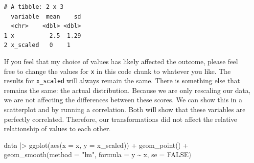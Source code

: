 \documentclass[
  letterpaper,
  DIV=11,
  numbers=noendperiod]{scrreprt}
\newenvironment{Shaded}{\begin{snugshade}}{\end{snugshade}}
\newcommand{\AttributeTok}[1]{\textcolor[rgb]{0.40,0.45,0.13}{#1}}
\newcommand{\CommentTok}[1]{\textcolor[rgb]{0.37,0.37,0.37}{#1}}
\newcommand{\ConstantTok}[1]{\textcolor[rgb]{0.56,0.35,0.01}{#1}}
\newcommand{\DecValTok}[1]{\textcolor[rgb]{0.68,0.00,0.00}{#1}}
\newcommand{\FunctionTok}[1]{\textcolor[rgb]{0.28,0.35,0.67}{#1}}
\newcommand{\NormalTok}[1]{\textcolor[rgb]{0.00,0.23,0.31}{#1}}
\newcommand{\OtherTok}[1]{\textcolor[rgb]{0.00,0.23,0.31}{#1}}
\newcommand{\SpecialCharTok}[1]{\textcolor[rgb]{0.37,0.37,0.37}{#1}}
\newcommand{\StringTok}[1]{\textcolor[rgb]{0.13,0.47,0.30}{#1}}
\begin{document}
\begin{Shaded}
\end{Shaded}

\begin{verbatim}
# A tibble: 2 x 3
  variable  mean    sd
  <chr>    <dbl> <dbl>
1 x          2.5  1.29
2 x_scaled   0    1   
\end{verbatim}

If you feel that my choice of values has likely affected the outcome,
please feel free to change the values for \texttt{x} in this code chunk
to whatever you like. The results for \texttt{x\_scaled} will always
remain the same. There is something else that remains the same: the
actual distribution. Because we are only rescaling our data, we are not
affecting the differences between these scores. We can show this in a
scatterplot and by running a correlation. Both will show that these
variables are perfectly correlated. Therefore, our transformations did
not affect the relative relationship of values to each other.

\begin{Shaded}
\begin{Highlighting}[]
\NormalTok{data }\SpecialCharTok{|\textgreater{}}
  \FunctionTok{ggplot}\NormalTok{(}\FunctionTok{aes}\NormalTok{(}\AttributeTok{x =}\NormalTok{ x,}
             \AttributeTok{y =}\NormalTok{ x\_scaled)) }\SpecialCharTok{+}
  \FunctionTok{geom\_point}\NormalTok{() }\SpecialCharTok{+}
  \FunctionTok{geom\_smooth}\NormalTok{(}\AttributeTok{method =} \StringTok{"lm"}\NormalTok{,}
              \AttributeTok{formula =}\NormalTok{ y }\SpecialCharTok{\textasciitilde{}}\NormalTok{ x,}
              \AttributeTok{se =} \ConstantTok{FALSE}\NormalTok{)}
\end{Highlighting}
\end{Shaded}
\end{document}
